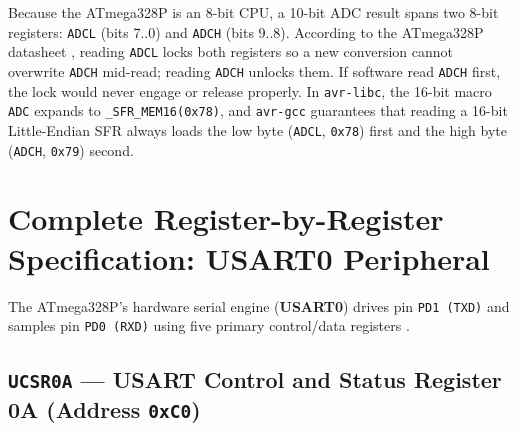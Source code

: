 \documentclass[11pt,a4paper,oneside]{report}
\begin{document}
Because the ATmega328P is an 8-bit CPU, a 10-bit ADC result spans two 8-bit registers: \texttt{ADCL} (bits 7..0) and \texttt{ADCH} (bits 9..8). According to the ATmega328P datasheet \cite{microchip_328p}, reading \texttt{ADCL} locks both registers so a new conversion cannot overwrite \texttt{ADCH} mid-read; reading \texttt{ADCH} unlocks them. If software read \texttt{ADCH} first, the lock would never engage or release properly. In \texttt{avr-libc}, the 16-bit macro \texttt{ADC} expands to \texttt{\_SFR\_MEM16(0x78)}, and \texttt{avr-gcc} guarantees that reading a 16-bit Little-Endian SFR always loads the low byte (\texttt{ADCL}, \texttt{0x78}) first and the high byte (\texttt{ADCH}, \texttt{0x79}) second.

\section{Complete Register-by-Register Specification: USART0 Peripheral}

The ATmega328P's hardware serial engine (\textbf{USART0}) drives pin \texttt{PD1 (TXD)} and samples pin \texttt{PD0 (RXD)} using five primary control/data registers \cite{microchip_328p}.

\subsection{\texttt{UCSR0A} --- USART Control and Status Register 0A (Address \texttt{0xC0})}
\end{document}
